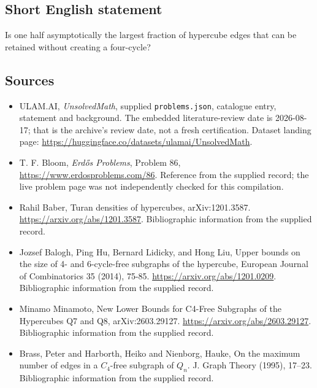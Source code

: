 \documentclass[11pt,a4paper]{article}
\begin{document}
\subsection{Short English statement}

Is one half asymptotically the largest fraction of hypercube edges that can be retained without creating a four-cycle?

\subsection{Sources}

{\small

\begin{itemize}

\item[\hypertarget{source:statement:1}{S1}] ULAM.AI, \emph{UnsolvedMath}, supplied \texttt{problems.json}, catalogue entry, statement and background. The embedded literature-review date is 2026-08-17; that is the archive’s review date, not a fresh certification. Dataset landing page: \url{https://huggingface.co/datasets/ulamai/UnsolvedMath}.

\item[\hypertarget{source:statement:2}{S2}] T. F. Bloom, \emph{Erdős Problems}, Problem 86, \url{https://www.erdosproblems.com/86}. Reference from the supplied record; the live problem page was not independently checked for this compilation.

\item[\hypertarget{source:statement:3}{S3}] Rahil Baber, Turan densities of hypercubes, arXiv:1201.3587. \url{https://arxiv.org/abs/1201.3587}. Bibliographic information from the supplied record.

\item[\hypertarget{source:statement:4}{S4}] Jozsef Balogh, Ping Hu, Bernard Lidicky, and Hong Liu, Upper bounds on the size of 4- and 6-cycle-free subgraphs of the hypercube, European Journal of Combinatorics 35 (2014), 75-85. \url{https://arxiv.org/abs/1201.0209}. Bibliographic information from the supplied record.

\item[\hypertarget{source:statement:5}{S5}] Minamo Minamoto, New Lower Bounds for C4-Free Subgraphs of the Hypercubes Q7 and Q8, arXiv:2603.29127. \url{https://arxiv.org/abs/2603.29127}. Bibliographic information from the supplied record.

\item[\hypertarget{source:statement:6}{S6}] Brass, Peter and Harborth, Heiko and Nienborg, Hauke, On the maximum number of edges in a {$C_4$}-free subgraph of {$Q_n$}. J. Graph Theory (1995), 17--23. Bibliographic information from the supplied record.

\end{itemize}

}

\label{end:statement}
\end{document}
